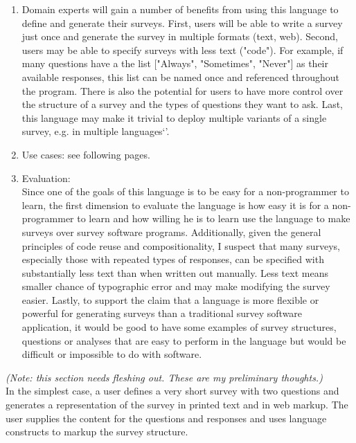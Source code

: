 \documentclass[12pt]{article}
\begin{document}
\begin{enumerate}[1)]
\item Domain experts will gain a number of benefits from using this language to
define and generate their surveys. First, users will be able to write a survey 
just once and generate the survey in multiple formats (text, web). Second, users
may be able to specify surveys with less text ("code"). For example, if many 
questions have a the list ["Always", "Sometimes", "Never"] as their available
responses, this list can be named once and referenced throughout the program.
There is also the potential for users to have more control over the structure of
a survey and the types of questions they want to ask. Last, this language may 
make it trivial to deploy multiple variants of a single survey, e.g. in multiple 
languages`'.

\item Use cases: see following pages.

\item Evaluation: \\
    Since one of the goals of this language is to be easy for a non-programmer to learn, the first dimension to evaluate the language is how easy it is for a non-programmer to learn and how willing he is to learn use the language to
    make surveys over survey software programs. Additionally,
    given the general principles of code reuse and compositionality, I suspect that many surveys, especially those with repeated types of responses, can be specified with substantially less text than when written out manually. Less text means smaller chance of
    typographic error and may make modifying the survey easier. Lastly, to support the claim that a language is more flexible or powerful for generating surveys than a traditional survey software application, it would be good to have some examples of survey structures, questions or analyses that are easy to perform in the language but would be difficult or impossible to do with software.

\end{enumerate}

\newpage

\textit{(Note: this section needs fleshing out. These are my preliminary thoughts.)} \\

In the simplest case, a user defines a very short survey with two questions and generates a representation of the survey in printed text and in web markup. The user supplies the content for the questions and responses and uses language constructs to markup the survey structure. \\
\end{document}
